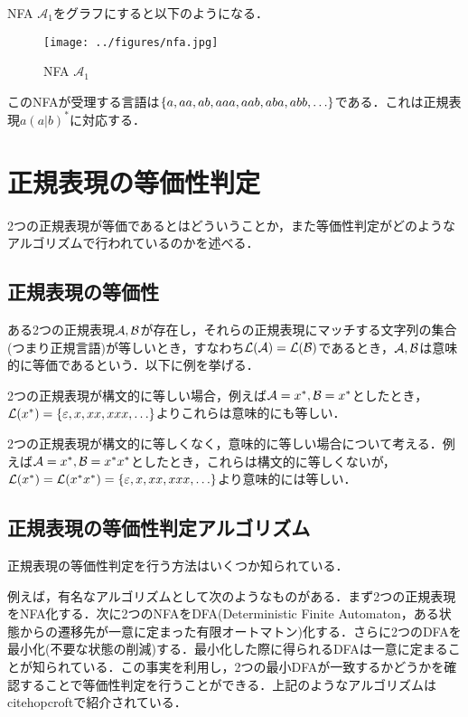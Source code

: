 \documentclass[a4paper, 12pt, dvipdfmx, uplatex]{jsreport}
\begin{document}
NFA $\mathcal{A}_1$をグラフにすると以下のようになる．
\begin{figure}[H] %
  \centering
  \texttt{[image: ../figures/nfa.jpg]}
  \caption{NFA $\mathcal{A}_1$\label{nfa_example}}
\end{figure}

このNFAが受理する言語は$\qty{a,aa,ab,aaa,aab,aba,abb,\ldots}$である．これは正規表現$a(a|b)^*$に対応する．


\section{正規表現の等価性判定}
2つの正規表現が等価であるとはどういうことか，また等価性判定がどのようなアルゴリズムで行われているのかを述べる．

\subsection{正規表現の等価性}
ある2つの正規表現$\mathcal{A},\mathcal{B}$が存在し，それらの正規表現にマッチする文字列の集合(つまり正規言語)が等しいとき，すなわち$\mathcal{L(A)}=\mathcal{L(B)}$であるとき，$\mathcal{A},\mathcal{B}$は意味的に等価であるという．以下に例を挙げる．

2つの正規表現が構文的に等しい場合，例えば$\mathcal{A}=x^*,\mathcal{B}=x^*$としたとき，$\mathcal{L}(x^*)=\qty{\varepsilon,x,xx,xxx,\ldots}$よりこれらは意味的にも等しい．

2つの正規表現が構文的に等しくなく，意味的に等しい場合について考える．例えば$\mathcal{A}=x^*,\mathcal{B}=x^*x^*$としたとき，これらは構文的に等しくないが，$\mathcal{L}(x^*)=\mathcal{L}(x^*x^*)=\qty{\varepsilon,x,xx,xxx,\ldots}$より意味的には等しい．

\subsection{正規表現の等価性判定アルゴリズム}\label{eq_check}
正規表現の等価性判定を行う方法はいくつか知られている．

例えば，有名なアルゴリズムとして次のようなものがある．まず2つの正規表現をNFA化する．次に2つのNFAをDFA(Deterministic Finite Automaton，ある状態からの遷移先が一意に定まった有限オートマトン)化する．さらに2つのDFAを最小化(不要な状態の削減)する．最小化した際に得られるDFAは一意に定まることが知られている．この事実を利用し，2つの最小DFAが一致するかどうかを確認することで等価性判定を行うことができる．上記のようなアルゴリズムはcite{hopcroft}で紹介されている．
\end{document}
